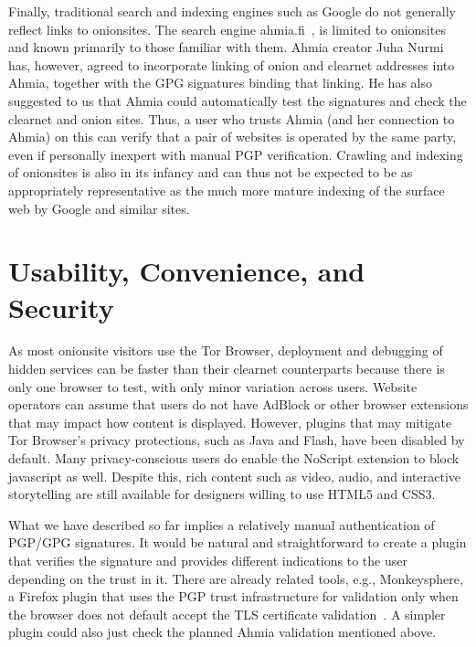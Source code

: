 \documentclass[10pt, conference, compsocconf]{styles/IEEEtran}
\begin{document}
Finally, traditional search and indexing engines such as Google do not
generally reflect links to onionsites. The
search engine ahmia.fi~\cite{ahmia}, is limited to
onionsites and known primarily to those
familiar with them. Ahmia creator Juha Nurmi has, however, agreed to
incorporate linking of onion and clearnet addresses into
Ahmia, together with the GPG signatures binding that linking.
He has also suggested to us that Ahmia could
automatically test the signatures and check the clearnet and onion
sites. Thus, a user who trusts Ahmia (and her connection to Ahmia)
on this can verify that a pair of
websites is operated by the same party, even if personally inexpert
with manual PGP verification.
Crawling and indexing of
onionsites is also in its infancy and can thus not be expected to be
as appropriately representative as the much more mature indexing of
the surface web by Google and similar sites.

\section{Usability, Convenience, and Security}

As most onionsite visitors use the Tor Browser, deployment and
debugging of hidden services can be faster than their clearnet
counterparts because there is only one browser to test, with only
minor variation across users.  Website operators can assume that users
do not have AdBlock or other browser extensions that may impact how
content is displayed.  However, plugins that may mitigate Tor
Browser's privacy protections, such as Java and Flash, have been
disabled by default.  Many privacy-conscious users do enable the
NoScript extension to block javascript as well.  Despite this, rich
content such as video, audio, and interactive storytelling are still
available for designers willing to use HTML5 and CSS3.

What we have described so far implies a relatively manual
authentication of PGP/GPG signatures. It would be natural and
straightforward to create a plugin that verifies the signature and
provides different indications to the user depending on the trust in
it.  There are already related tools, e.g., Monkeysphere, a Firefox
plugin that uses the PGP trust infrastructure for validation only when
the browser does not default accept the TLS certificate
validation~\cite{monkeysphere}. A simpler plugin could also
just check the planned Ahmia validation mentioned above.
\end{document}
